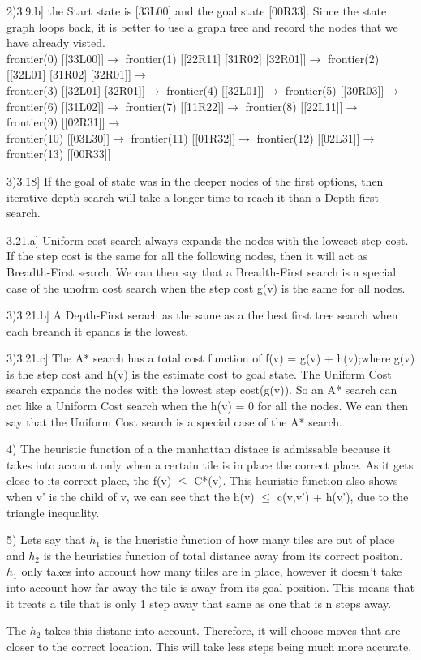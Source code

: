 \documentclass[12pt,english]{article}
\begin{document}
2)3.9.b] the Start state is [33L00] and the goal state [00R33]. Since the state graph loops back, it is better to use a graph tree and record the nodes that we have already visted.\\
frontier(0) [[33L00]]$\rightarrow$ frontier(1) [[22R11] [31R02] [32R01]]$\rightarrow$  frontier(2) [[32L01] [31R02] [32R01]]$\rightarrow$\\ 
frontier(3) [[32L01] [32R01]]$\rightarrow$ frontier(4) [[32L01]]$\rightarrow$  frontier(5) [[30R03]]$\rightarrow$\\ 
frontier(6) [[31L02]]$\rightarrow$ frontier(7) [[11R22]]$\rightarrow$  frontier(8) [[22L11]]$\rightarrow$  frontier(9) [[02R31]]$\rightarrow$\\ 
frontier(10) [[03L30]]$\rightarrow$ frontier(11) [[01R32]]$\rightarrow$  frontier(12) [[02L31]]$\rightarrow$  frontier(13) [[00R33]]\par
3)3.18] If the goal of state was in the deeper nodes of the first options, then iterative depth search will take a longer time to reach it than a Depth first search.\par
3.21.a] Uniform cost search always expands the nodes with the loweset step cost. If the step cost is the same for all the following nodes, then it will act as  Breadth-First search. We can then say that a Breadth-First search is a special case of the unofrm cost search when the step cost g(v) is the same for all nodes.\par
3)3.21.b] A Depth-First serach as the same as a the best first tree search when each breanch it epands is the lowest.\par
3)3.21.c] The A* search has a total cost function of f(v) = g(v) + h(v);where g(v) is the step cost and h(v) is the estimate cost to goal state. The Uniform Cost search expands the nodes with the lowest step cost(g(v)). So an A* search can act like a Uniform Cost search when the  h(v) = 0 for all the nodes.  We can then say that the Uniform Cost search is a special case of the A* search.\par
4) The heuristic function of a the manhattan distace is admissable because it takes into account only when a certain tile is in place the correct place. As it gets close to its correct place, the f(v) $\leq$ C*(v). This heuristic function also shows when v' is the child of v, we can see that the h(v) $\leq$ c(v,v') + h(v'), due to the triangle inequality.\par
5) Lets say that $h_1$ is the hueristic function of how many tiles are out of place and $h_2$ is the heuristics function of total distance away from its correct positon. $h_1$ only takes into account how many tiiles are in place, however it doesn't take into account how far away the tile is away from its goal position. This means that it treats a tile that is only 1 step away that same as one that is n steps away.\par
The $h_2$ takes this distane into account. Therefore, it will choose moves that are closer to the correct location. This will take less steps being much more accurate.
\end{document}
